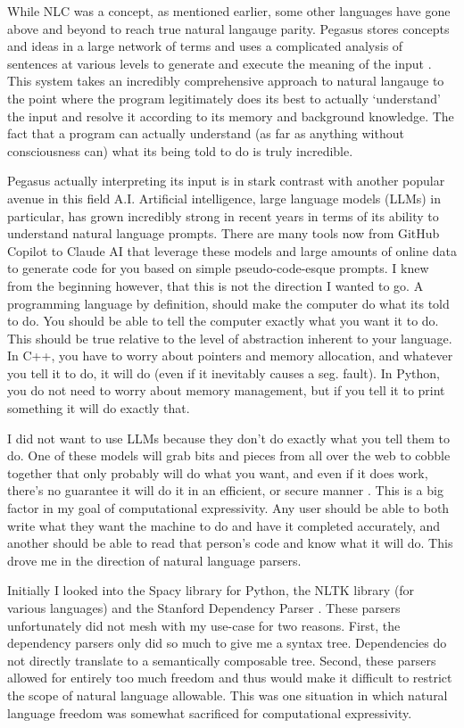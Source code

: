 \documentclass[titlepage]{article}
\begin{document}
While NLC was a concept, as mentioned earlier, some other languages have gone above and beyond to reach true natural langauge parity. Pegasus stores concepts and ideas in a large network of terms and uses a complicated analysis of sentences at various levels to generate and execute the meaning of the input \cite{Knöll2006PegasusFS}. This system takes an incredibly comprehensive approach to natural langauge to the point where the program legitimately does its best to actually `understand' the input and resolve it according to its memory and background knowledge. The fact that a program can actually understand (as far as anything without consciousness can) what its being told to do is truly incredible.

Pegasus actually interpreting its input is in stark contrast with another popular avenue in this field A.I. Artificial intelligence, large language models (LLMs) in particular, has grown incredibly strong in recent years in terms of its ability to understand natural language prompts. There are many tools now from GitHub Copilot to Claude AI that leverage these models and large amounts of online data to generate code for you based on simple pseudo-code-esque prompts. I knew from the beginning however, that this is not the direction I wanted to go. A programming language by definition, should make the computer do what its told to do. You should be able to tell the computer exactly what you want it to do. This should be true relative to the level of abstraction inherent to your language. In C++, you have to worry about pointers and memory allocation, and whatever you tell it to do, it will do (even if it inevitably causes a seg. fault). In Python, you do not need to worry about memory management, but if you tell it to print something it will do exactly that.

I did not want to use LLMs because they don't do exactly what you tell them to do. One of these models will grab bits and pieces from all over the web to cobble together that only probably will do what you want, and even if it does work, there's no guarantee it will do it in an efficient, or secure manner \cite{Fu2023SecurityWO}. This is a big factor in my goal of computational expressivity. Any user should be able to both write what they want the machine to do and have it completed accurately, and another should be able to read that person's code and know what it will do. This drove me in the direction of natural language parsers.

Initially I looked into the Spacy library for Python, the NLTK library (for various languages) and the Stanford Dependency Parser \cite{Marneffe2006GeneratingTD}. These parsers unfortunately did not mesh with my use-case for two reasons. First, the dependency parsers only did so much to give me a syntax tree. Dependencies do not directly translate to a semantically composable tree. Second, these parsers allowed for entirely too much freedom and thus would make it difficult to restrict the scope of natural language allowable. This was one situation in which natural language freedom was somewhat sacrificed for computational expressivity.
\end{document}
